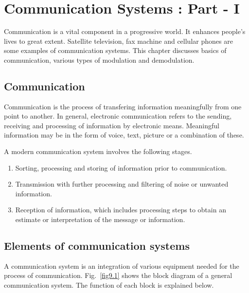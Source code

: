 \chapter{Communication Systems : Part - I}\label{chap9}

Communication is a vital component in a progressive world. It enhances people's lives to great extent. Satellite television, fax machine and cellular phones are some examples of communication systems. This chapter discusses basics of communication, various types of modulation and demodulation.

\section{Communication}\label{sec9.1}

Communication is the process of transfering information meaningfully from one point to another. In general, electronic communication refers to the sending, receiving and processing of information by electronic means. Meaningful information may be in the form of voice, text, picture or a combination of these.

A modern communication system involves the following stages. 
\begin{enumerate}
\item Sorting, processing and storing of information prior to communication.

\item Transmission with further processing and filtering of noise or unwanted information.

\item Reception of information, which includes processing steps to obtain an estimate or interpretation of the message or information.
\end{enumerate}

\section{Elements of communication systems}\label{sec9.2}

A communication system is an integration of various equipment needed for the process of communication. Fig.~\ref{fig9.1} shows the block diagram of a general communication system. The function of each block is explained below.

